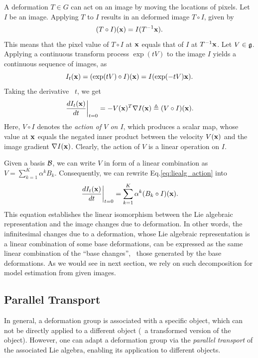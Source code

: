 A deformation $T \in G$ can act on an image by moving the locations of
pixels. Let $I$ be an image. Applying $T$ to $I$ results in an
deformed image $T \circ I$, given by
\begin{equation}
    (T \circ I)({\mathbf{x}}) = I(T^{-1} {\mathbf{x}}).
\end{equation}
This means that the pixel value of $T \circ I$ at ${\mathbf{x}}$ equals that of
$I$ at $T^{-1} {\mathbf{x}}$.
Let $V \in \mathfrak{g}$. Applying a continuous transform process $\exp(tV)$ to
the image $I$ yields a continuous sequence of images, as
\begin{equation}
    I_t({\mathbf{x}}) = (\exp(tV) \circ I)({\mathbf{x}})
    = I(\exp(-tV) {\mathbf{x}}).
\end{equation}
Taking the derivative \wrt~$t$, we get
\begin{equation} \label{eq:liealg_action}
    \left. \frac{d I_t({\mathbf{x}})}{dt} \right|_{t=0}
    = - V({\mathbf{x}})^T \nabla I({\mathbf{x}})
    \triangleq (V \circ I) ({\mathbf{x}}).
\end{equation}
Here, $V \circ I$ denotes the \emph{action of $V$ on $I$}, which
produces a scalar map, whose value at ${\mathbf{x}}$ equals the negated inner
product between the velocity $V({\mathbf{x}})$ and the image gradient
$\nabla I({\mathbf{x}})$. Clearly, the action of $V$ is a linear operation on
$I$.

Given a basis $\mathcal{B}$, we can write $V$ in form of a linear
combination as $V = \sum_{k=1}^K \alpha^k B_k$. Consequently, we can
rewrite Eq.\eqref{eq:liealg_action} into
\begin{equation} \label{eq:liealg_actiond}
    \left. \frac{d I_t({\mathbf{x}})}{dt} \right|_{t=0}
    = \sum_{k=1}^K \alpha^k (B_k \circ I)({\mathbf{x}}).
\end{equation}
This equation establishes the linear isomorphism between the Lie
algebraic representation and the image changes due to deformation.
In other words, the infinitesimal changes due to a deformation, 
whose Lie algebraic representation is a linear combination of some
base deformations, can be expressed as the same linear combination of
the ``base changes'', \ie~those generated by the base deformations.
As we would see in next section, we rely on such decomposition for
model estimation from given images.



\subsection{Parallel Transport}

In general, a deformation group is associated with a specific object,
which can not be directly applied to a different object (\eg~a
transformed version of the object).
However, one can adapt a deformation group via the
\emph{parallel transport} of the associated Lie algebra, enabling its
application to different objects.

